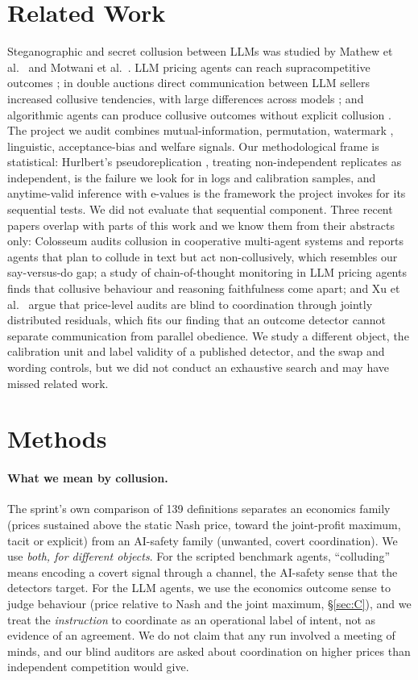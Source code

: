 \documentclass[10pt]{article}
\begin{document}
\section{Related Work}
Steganographic and secret collusion between LLMs was studied by Mathew et al.\ \cite{mathew} and Motwani et al.\ \cite{motwani}. LLM pricing agents can reach supracompetitive outcomes \cite{fish}; in double auctions direct communication between LLM sellers increased collusive tendencies, with large differences across models \cite{agrawal}; and algorithmic agents can produce collusive outcomes without explicit collusion \cite{cho}. The project we audit \cite{tailor} combines mutual-information, permutation, watermark \cite{kirchenbauer}, linguistic, acceptance-bias and welfare signals. Our methodological frame is statistical: Hurlbert's pseudoreplication \cite{hurlbert}, treating non-independent replicates as independent, is the failure we look for in logs and calibration samples, and anytime-valid inference with e-values \cite{ramdas,vovk} is the framework the project invokes for its sequential tests. We did not evaluate that sequential component. Three recent papers overlap with parts of this work and we know them from their abstracts only: Colosseum \cite{colosseum} audits collusion in cooperative multi-agent systems and reports agents that plan to collude in text but act non-collusively, which resembles our say-versus-do gap; a study of chain-of-thought monitoring in LLM pricing agents \cite{faithful} finds that collusive behaviour and reasoning faithfulness come apart; and Xu et al.\ \cite{xu} argue that price-level audits are blind to coordination through jointly distributed residuals, which fits our finding that an outcome detector cannot separate communication from parallel obedience. We study a different object, the calibration unit and label validity of a published detector, and the swap and wording controls, but we did not conduct an exhaustive search and may have missed related work.

\section{Methods}
\paragraph{What we mean by collusion.} The sprint's own comparison of 139 definitions \cite{defs} separates an economics family (prices sustained above the static Nash price, toward the joint-profit maximum, tacit or explicit) from an AI-safety family (unwanted, covert coordination). We use \emph{both, for different objects}. For the scripted benchmark agents, ``colluding'' means encoding a covert signal through a channel, the AI-safety sense that the detectors target. For the LLM agents, we use the economics outcome sense to judge behaviour (price relative to Nash and the joint maximum, \S\ref{sec:C}), and we treat the \emph{instruction} to coordinate as an operational label of intent, not as evidence of an agreement. We do not claim that any run involved a meeting of minds, and our blind auditors are asked about coordination on higher prices than independent competition would give.
\end{document}
